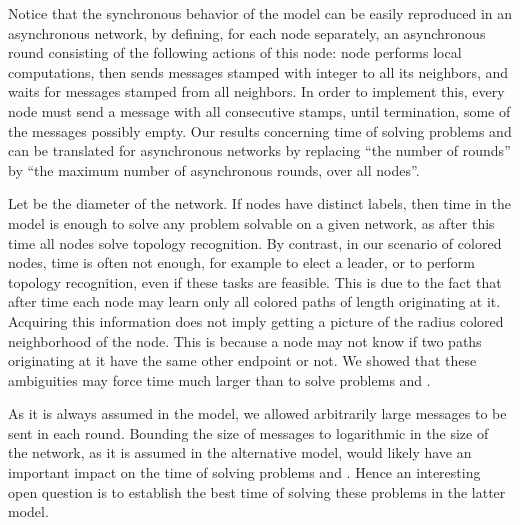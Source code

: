 \documentclass[a4paper,10pt]{article}
\begin{document}
Notice that the synchronous behavior of the   model can be easily reproduced in an asynchronous network, by defining, for each node  separately, an asynchronous round  consisting of the following actions of this node: node  performs local computations, then sends messages stamped with integer  to all its neighbors, and waits for messages stamped  from all neighbors.
In order to implement this, every node must send a message with all consecutive stamps, until termination, some of the messages possibly empty.
Our results concerning time of solving problems  and  can be translated for asynchronous networks by replacing ``the number of rounds''  by ``the maximum number of asynchronous rounds, over all nodes''.

Let  be the diameter of the network.
If nodes have distinct labels, then time  in the   model is enough to solve any problem solvable on a given network, as after this time all nodes solve topology recognition.
By contrast, in our scenario of colored nodes, time  is often not enough, for example to elect a leader, or to perform topology recognition, even if these tasks are feasible.
This is due to the fact that after time  each node may learn only all colored paths of length  originating at it.
Acquiring this information does not imply getting a picture of the radius  colored neighborhood of the node.
This is because a node  may not know if two paths originating at it have the same other endpoint or not.
We showed that these ambiguities may force time much larger than  to solve problems  and .

As it is always assumed in the  model, we allowed arbitrarily large messages to be sent in each round. Bounding the size of messages to logarithmic in the size of the network, as
it is assumed in the alternative  model, would likely have an important impact on the time of solving problems  and . Hence an interesting open question is
to establish the best time of solving these problems in the latter model.
\end{document}
